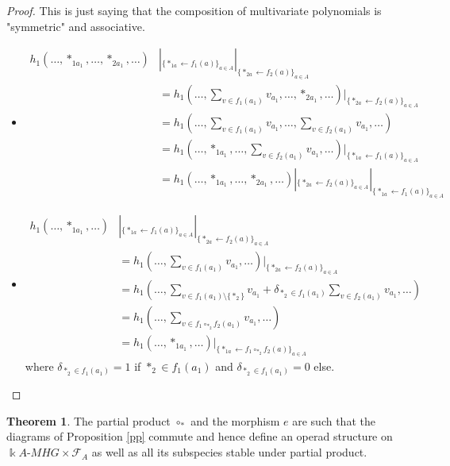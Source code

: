 \documentclass[a4paper]{article}
\theoremstyle{definition}
\newtheorem{theorem}[definition]{Theorem}
\begin{document}
\begin{proof}
This is just saying that the composition of multivariate polynomials is "symmetric" and associative.
\begin{itemize}
\item \begin{align*}
h_1(\dots, \ast_{1a_1},\dots,\ast_{2a_1},\dots)&|_{\{\ast_{1a}\leftarrow f_1(a)\}_{a\in A}}|_{\{\ast_{2a}\leftarrow f_2(a)\}_{a\in A}} \\
&= h_1(\dots, \sum_{v\in f_1(a_1)}v_{a_1},\dots, \ast_{2a_1},\dots)|_{\{\ast_{2a}\leftarrow f_2(a)\}_{a\in A}} \\
&= h_1(\dots, \sum_{v\in f_1(a_1)}v_{a_1},\dots, \sum_{v\in f_2(a_1)}v_{a_1},\dots) \\
&= h_1(\dots, \ast_{1a_1},\dots, \sum_{v\in f_2(a_1)}v_{a_1},\dots)|_{\{\ast_{1a}\leftarrow f_1(a)\}_{a\in A}} \\
&= h_1(\dots, \ast_{1a_1},\dots,\ast_{2a_1},\dots)|_{\{\ast_{2a}\leftarrow f_2(a)\}_{a\in A}}|_{\{\ast_{1a}\leftarrow f_1(a)\}_{a\in A}}
\end{align*}
\item \begin{align*}
h_1(\dots,\ast_{1a_1},\dots)&|_{\{\ast_{1a}\leftarrow f_1(a)\}_{a\in A}}|_{\{\ast_{2a}\leftarrow f_2(a)\}_{a\in A}} \\
&= h_1(\dots, \sum_{v\in f_1(a_1)}v_{a_1},\dots)|_{\{\ast_{2a}\leftarrow f_2(a)\}_{a\in A}} \\
&= h_1(\dots, \sum_{v\in f_1(a_1)\setminus\{\ast_2\}}v_{a_1} + \delta_{\ast_2\in f_1(a_1)}\sum_{v\in f_2(a_1)}v_{a_1},\dots) \\
&= h_1(\dots, \sum_{v\in f_1\circ_{\ast_2}f_2(a_1)}v_{a_1},\dots) \\
&= h_1(\dots,\ast_{1a_1},\dots)|_{\{\ast_{1a}\leftarrow f_1\circ_{\ast_2}f_2(a)\}_{a\in A}}
\end{align*}
where $\delta_{\ast_2\in f_1(a_1)} =1$ if $\ast_2\in f_1(a_1)$ and $\delta_{\ast_2\in f_1(a_1)} =0$ else.
\end{itemize}
\end{proof}

\begin{theorem}
The partial product $\circ_{\ast}$ and the morphism $e$ are such that the diagrams of Proposition \ref{pp} commute and hence define an operad structure on $\Bbbk A\text{-}MHG\times\mathcal{F}_A$ as well as all its subspecies stable under partial product. 
\end{theorem}
\end{document}
